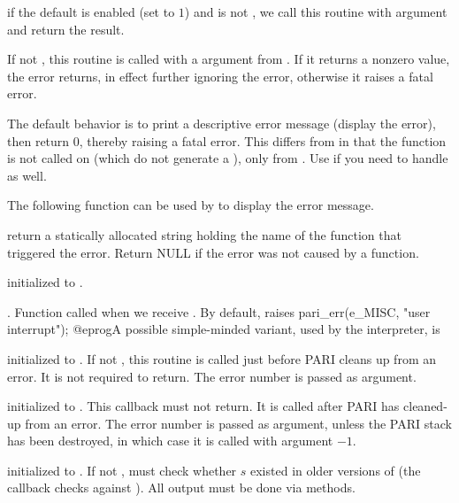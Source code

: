  if the 
default is enabled (set to $1$) and  is not
, we call this routine with  argument and return the
result.

If not , this routine is called with a  argument
from . If it returns a nonzero value, the error returns, in
effect further ignoring the error, otherwise it raises a fatal error.

The default behavior is to print a descriptive error
message (display the error), then return 0, thereby raising a fatal error.
This differs from  in that the
function is not called on  (which do not generate a ),
only from . Use  if you need to handle
 as well.

The following function can be used by  to display
the error message.

 return a statically allocated string
holding the name of the function that triggered the error. Return NULL if the
error was not caused by a function.

initialized to .

.
Function called when we receive . By default, raises
\bprog
  pari_err(e_MISC, "user interrupt");
@eprog\noindent A possible simple-minded variant, used by the
 interpreter, is


initialized to . If not , this routine is called just
before PARI cleans up from an error. It is not required to return.  The error
number is passed as argument.

initialized to . This callback must not return.
It is called after PARI has cleaned-up from an error. The error number is
passed as argument, unless the PARI stack has been destroyed, in which case
it is called with argument $-1$.

 initialized to . If not , must check whether $s$
existed in older versions of  (the  callback checks against
). All output must be done via  methods.

